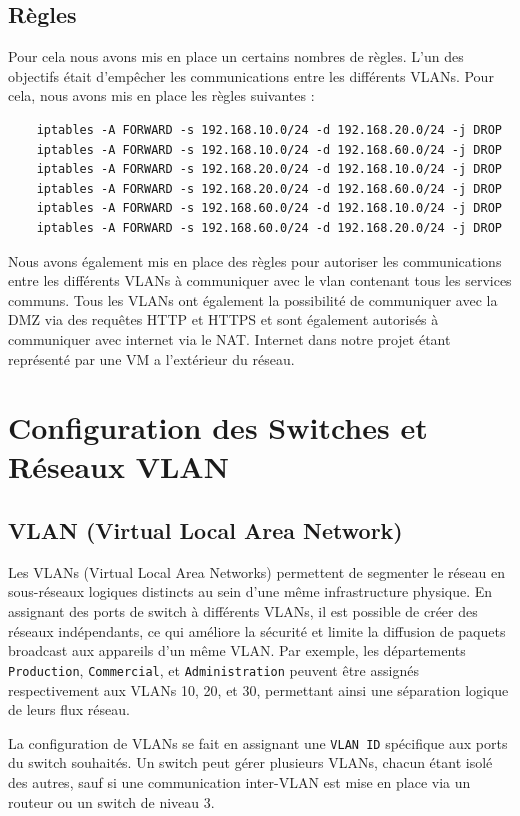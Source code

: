 \documentclass[a4paper,12pt]{report}
\begin{document}
            \subsection{Règles}
            Pour cela nous avons mis en place un certains nombres de règles. L'un des objectifs était d'empêcher les communications entre les différents VLANs. Pour cela, nous avons mis en place les règles suivantes :
            \begin{verbatim}
    iptables -A FORWARD -s 192.168.10.0/24 -d 192.168.20.0/24 -j DROP
    iptables -A FORWARD -s 192.168.10.0/24 -d 192.168.60.0/24 -j DROP
    iptables -A FORWARD -s 192.168.20.0/24 -d 192.168.10.0/24 -j DROP
    iptables -A FORWARD -s 192.168.20.0/24 -d 192.168.60.0/24 -j DROP
    iptables -A FORWARD -s 192.168.60.0/24 -d 192.168.10.0/24 -j DROP
    iptables -A FORWARD -s 192.168.60.0/24 -d 192.168.20.0/24 -j DROP
            \end{verbatim}
            Nous avons également mis en place des règles pour autoriser les communications entre les différents VLANs à communiquer avec le vlan contenant tous les services communs. Tous les VLANs ont également la possibilité de communiquer avec la DMZ via des requêtes HTTP et HTTPS et sont également autorisés à communiquer avec internet via le NAT. Internet dans notre projet étant représenté par une VM a l'extérieur du réseau. 

        \section{Configuration des Switches et Réseaux VLAN}

            \subsection{VLAN (Virtual Local Area Network)}
                Les VLANs (Virtual Local Area Networks) permettent de segmenter le réseau en sous-réseaux logiques distincts au sein d'une même infrastructure physique. En assignant des ports de switch à différents VLANs, il est possible de créer des réseaux indépendants, ce qui améliore la sécurité et limite la diffusion de paquets broadcast aux appareils d'un même VLAN. Par exemple, les départements \texttt{Production}, \texttt{Commercial}, et \texttt{Administration} peuvent être assignés respectivement aux VLANs 10, 20, et 30, permettant ainsi une séparation logique de leurs flux réseau.

                La configuration de VLANs se fait en assignant une \texttt{VLAN ID} spécifique aux ports du switch souhaités. Un switch peut gérer plusieurs VLANs, chacun étant isolé des autres, sauf si une communication inter-VLAN est mise en place via un routeur ou un switch de niveau 3.
\end{document}
